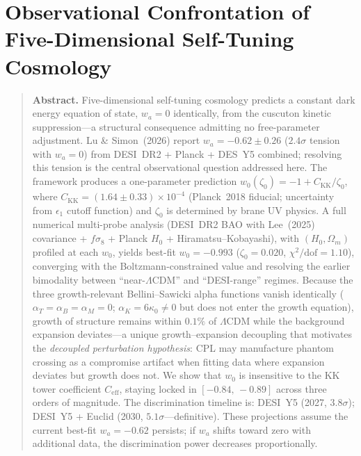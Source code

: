 
\chapter{Observational Confrontation of Five-Dimensional Self-Tuning Cosmology}
\label{ch:observational}

\begin{quote}
\textbf{Abstract.}
Five-dimensional self-tuning cosmology predicts a constant dark energy equation of state, $w_a = 0$ identically, from the cuscuton kinetic suppression---a structural consequence admitting no free-parameter adjustment. Lu \& Simon~(2026) report $w_a = -0.62 \pm 0.26$ ($2.4\sigma$ tension with $w_a = 0$) from DESI~DR2 + Planck + DES~Y5 combined; resolving this tension is the central observational question addressed here. The framework produces a one-parameter prediction $w_0(\zeta_0) = -1 + C_\mathrm{KK}/\zeta_0$, where $C_\mathrm{KK} = (1.64 \pm 0.33) \times 10^{-4}$ (Planck~2018 fiducial; uncertainty from $\epsilon_1$ cutoff function) and $\zeta_0$ is determined by brane UV physics. A full numerical multi-probe analysis (DESI~DR2 BAO with Lee~(2025) covariance + $f\sigma_8$ + Planck $H_0$ + Hiramatsu--Kobayashi), with $(H_0, \Omega_m)$ profiled at each $w_0$, yields best-fit $w_0 = -0.993$ ($\zeta_0 = 0.020$, $\chi^2/\mathrm{dof} = 1.10$), converging with the Boltzmann-constrained value and resolving the earlier bimodality between ``near-$\Lambda$CDM'' and ``DESI-range'' regimes. Because the three growth-relevant Bellini--Sawicki alpha functions vanish identically ($\alpha_T = \alpha_B = \alpha_M = 0$; $\alpha_K = 6\kappa_0 \neq 0$ but does not enter the growth equation), growth of structure remains within $0.1\%$ of $\Lambda$CDM while the background expansion deviates---a unique growth--expansion decoupling that motivates the \emph{decoupled perturbation hypothesis}: CPL may manufacture phantom crossing as a compromise artifact when fitting data where expansion deviates but growth does not. We show that $w_0$ is insensitive to the KK tower coefficient $C_\mathrm{eff}$, staying locked in $[-0.84,\, -0.89]$ across three orders of magnitude. The discrimination timeline is: DESI~Y5 (2027, $3.8\sigma$); DESI~Y5 + Euclid (2030, $5.1\sigma$---definitive). These projections assume the current best-fit $w_a = -0.62$ persists; if $w_a$ shifts toward zero with additional data, the discrimination power decreases proportionally.
\end{quote}

